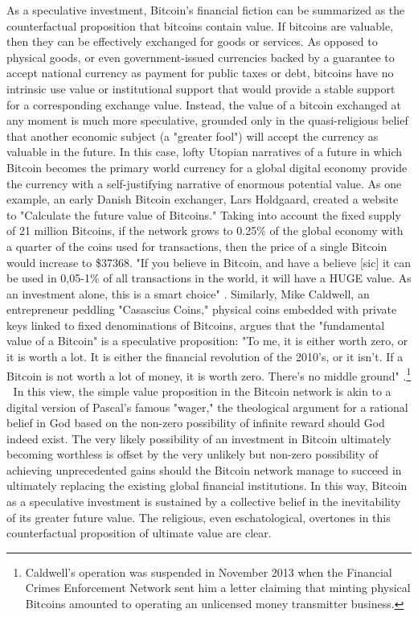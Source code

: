 As a speculative investment, Bitcoin's financial fiction can be summarized as the counterfactual proposition that bitcoins contain value. If bitcoins are valuable, then they can be effectively exchanged for goods or services. As opposed to physical goods, or even government-issued currencies backed by a guarantee to accept national currency as payment for public taxes or debt, bitcoins have no intrinsic use value or institutional support that would provide a stable support for a corresponding exchange value. Instead, the value of a bitcoin exchanged at any moment is much more speculative, grounded only in the quasi-religious belief that another economic subject (a "greater fool") will accept the currency as valuable in the future. In this case, lofty Utopian narratives of a future in which Bitcoin becomes the primary world currency for a global digital economy provide the currency with a self-justifying narrative of enormous potential value. As one example, an early Danish Bitcoin exchanger, Lars Holdgaard, created a website to "Calculate the future value of Bitcoins." Taking into account the fixed supply of 21 million Bitcoins, if the network grows to 0.25\% of the global economy with a quarter of the coins used for transactions, then the price of a single Bitcoin would increase to \$37368. "If you believe in Bitcoin, and have a believe [sic] it can be used in 0,05-1\% of all transactions in the world, it will have a HUGE value. As an investment alone, this is a smart choice" \autocite{Holdgaard13}. Similarly, Mike Caldwell, an entrepreneur peddling "Casascius Coins," physical coins embedded with private keys linked to fixed denominations of Bitcoins, argues that the "fundamental value of a Bitcoin" is a speculative proposition: "To me, it is either worth zero, or it is worth a lot. It is either the financial revolution of the 2010's, or it isn't. If a Bitcoin is not worth a lot of money, it is worth zero. There's no middle ground" \autocite{Caldwell13}.\footnote{
  Caldwell's operation was suspended in November 2013 when the Financial Crimes Enforcement Network sent him a letter claiming that minting physical Bitcoins amounted to operating an unlicensed money transmitter business.
}

In this view, the simple value proposition in the Bitcoin network is akin to a digital version of Pascal's famous "wager," the theological argument for a rational belief in God based on the non-zero possibility of infinite reward should God indeed exist. The very likely possibility of an investment in Bitcoin ultimately becoming worthless is offset by the very unlikely but non-zero possibility of achieving unprecedented gains should the Bitcoin network manage to succeed in ultimately replacing the existing global financial institutions. In this way, Bitcoin as a speculative investment is sustained by a collective belief in the inevitability of its greater future value. The religious, even eschatological, overtones in this counterfactual proposition of ultimate value are clear.

